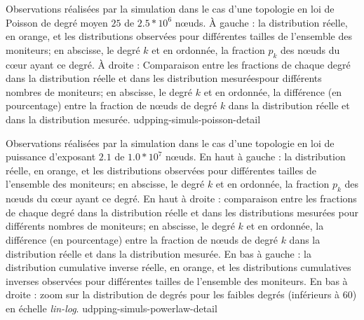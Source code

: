 

 {Observations réalisées par la
simulation dans le cas d'une topologie en loi de Poisson de degré moyen $25$ de
$2.5*10^6$ n\oe{}uds. À gauche : la distribution réelle, en orange, et les
distributions observées pour différentes tailles de l'ensemble des moniteurs; en
abscisse, le degré $k$ et en ordonnée, la fraction $p_k$ des n\oe{}uds du
c\oe{}ur ayant ce degré. À droite : Comparaison entre les fractions de chaque
degré dans la distribution réelle et dans les distribution mesuréespour
différents nombres de moniteurs; en abscisse, le degré $k$ et en ordonnée, la
différence (en pourcentage) entre la fraction de n\oe{}uds de degré $k$ dans la
distribution réelle et dans la distribution mesurée.}
{udpping-simuls-poisson-detail}

 {Observations réalisées par la
simulation dans le cas d'une topologie en loi de puissance d'exposant $2.1$ de
$1.0*10^7$ n\oe{}uds. En haut à gauche : la distribution réelle, en orange, et
les distributions observées pour différentes tailles de l'ensemble des
moniteurs; en abscisse, le degré $k$ et en ordonnée, la fraction $p_k$ des
n\oe{}uds du c\oe{}ur ayant ce degré. En haut à droite : comparaison entre les
fractions de chaque degré dans la distribution réelle et dans les distributions
mesurées pour différents nombres de moniteurs; en abscisse, le degré $k$ et en
ordonnée, la différence (en pourcentage) entre la fraction de n\oe{}uds de degré
$k$ dans la distribution réelle et dans la distribution mesurée. En bas à gauche
: la distribution cumulative inverse réelle, en orange, et les distributions
cumulatives inverses observées pour différentes tailles de l'ensemble des
moniteurs. En bas à droite : zoom sur la distribution de degrés pour les faibles
degrés (inférieurs à 60) en échelle {\em lin-log}.}
{udpping-simuls-powerlaw-detail}

